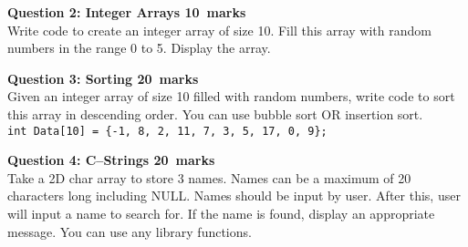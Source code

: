 \documentclass[12pt,a4paper]{article}
\def\Qtwo{10}
\def\Qthree{20}
\def\Qfour{20}
\begin{document}
\noindent\textbf{Question 2: Integer Arrays \hfill \Qtwo~marks}\\
Write code to create an integer array of size 10. Fill this array with random numbers in the range 0 to 5. Display the array.
\begin{figure}[H]
\end{figure}

\noindent\textbf{Question 3: Sorting \hfill \Qthree~marks}\\
Given an integer array of size 10 filled with random numbers, write code to sort this array in descending order. You can use bubble sort OR insertion sort.\\
\verb|int Data[10] = {-1, 8, 2, 11, 7, 3, 5, 17, 0, 9};|
\begin{figure}[H]
\end{figure}

\noindent\textbf{Question 4: C--Strings \hfill \Qfour~marks}\\
Take a 2D char array to store 3 names. Names can be a maximum of 20 characters long including NULL. Names should be input by user. After this, user will input a name to search for. If the name is found, display an appropriate message. You can use any library functions.
\begin{figure}[H]
\end{figure}
\end{document}
